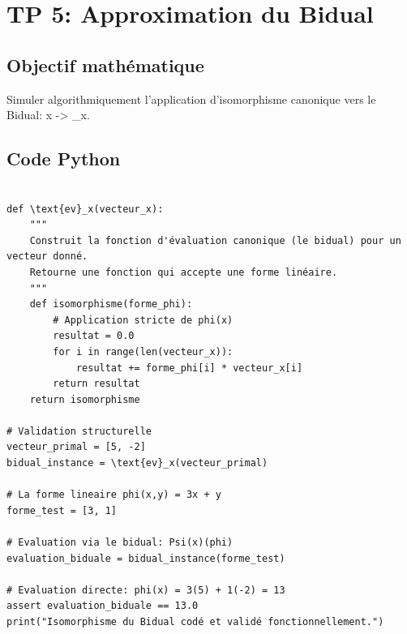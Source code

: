 \documentclass[11pt,a4paper]{report}
\begin{document}
\section{TP 5: Approximation du Bidual}

\subsection{Objectif mathématique}
Simuler algorithmiquement l'application d'isomorphisme canonique vers le Bidual: x -> _x.

\subsection{Code Python}
\begin{lstlisting}

def \text{ev}_x(vecteur_x):
    """
    Construit la fonction d'évaluation canonique (le bidual) pour un vecteur donné.
    Retourne une fonction qui accepte une forme linéaire.
    """
    def isomorphisme(forme_phi):
        # Application stricte de phi(x)
        resultat = 0.0
        for i in range(len(vecteur_x)):
            resultat += forme_phi[i] * vecteur_x[i]
        return resultat
    return isomorphisme

# Validation structurelle
vecteur_primal = [5, -2]
bidual_instance = \text{ev}_x(vecteur_primal)

# La forme lineaire phi(x,y) = 3x + y
forme_test = [3, 1]

# Evaluation via le bidual: Psi(x)(phi)
evaluation_biduale = bidual_instance(forme_test)

# Evaluation directe: phi(x) = 3(5) + 1(-2) = 13
assert evaluation_biduale == 13.0
print("Isomorphisme du Bidual codé et validé fonctionnellement.")
\end{lstlisting}
\end{document}
